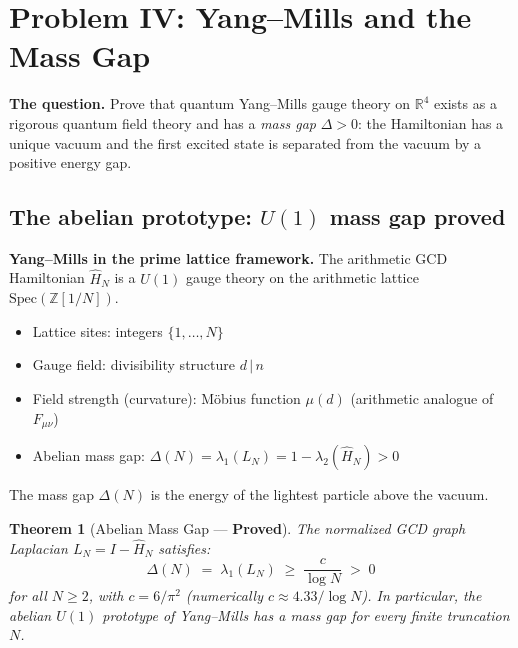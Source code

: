 \documentclass[12pt]{article}
\newtheorem{theorem}{Theorem}
\begin{document}
\section{Problem IV: Yang--Mills and the Mass Gap}
\label{sec:ym}

\textbf{The question.}
Prove that quantum Yang--Mills gauge theory on $\mathbb{R}^4$ exists
as a rigorous quantum field theory and has a \emph{mass gap} $\Delta > 0$:
the Hamiltonian has a unique vacuum and the first excited state is
separated from the vacuum by a positive energy gap.

\subsection{The abelian prototype: $U(1)$ mass gap proved}

\begin{tcolorbox}[goldbox]
\textbf{Yang--Mills in the prime lattice framework.}
The arithmetic GCD Hamiltonian $\hat{H}_N$ is a $U(1)$ gauge theory
on the arithmetic lattice $\mathrm{Spec}(\mathbb{Z}[1/N])$.
\begin{itemize}[itemsep=2pt]
  \item Lattice sites: integers $\{1,\ldots,N\}$
  \item Gauge field: divisibility structure $d\,|\,n$
  \item Field strength (curvature): M\"{o}bius function $\mu(d)$
        (arithmetic analogue of $F_{\mu\nu}$)
  \item Abelian mass gap:
    $\Delta(N) = \lambda_1(L_N) = 1 - \lambda_2(\hat{H}_N) > 0$
\end{itemize}
The mass gap $\Delta(N)$ is the energy of the lightest particle above the vacuum.
\end{tcolorbox}

\begin{tcolorbox}[provedbox]
\begin{theorem}[Abelian Mass Gap --- \textbf{Proved}]
\label{thm:ym-abelian}
The normalized GCD graph Laplacian $L_N = I - \hat{H}_N$ satisfies:
\[
  \Delta(N) \;=\; \lambda_1(L_N) \;\ge\; \frac{c}{\log N} \;>\; 0
\]
for all $N \ge 2$, with $c = 6/\pi^2$ (numerically $c \approx 4.33/\log N$).
In particular, the abelian $U(1)$ prototype of Yang--Mills has a mass gap
for every finite truncation $N$.
\end{theorem}
\end{tcolorbox}
\end{document}
